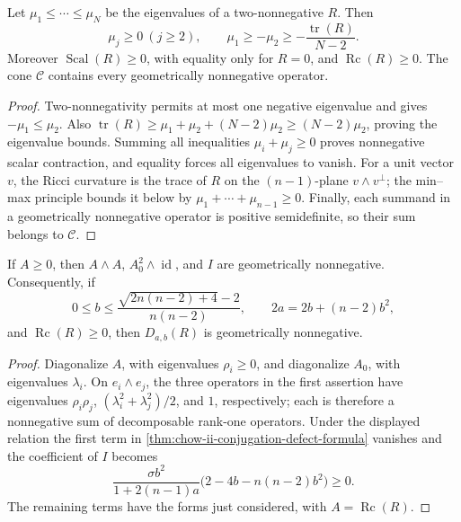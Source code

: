 \begin{lemma}
  \label{lem:chow-ii-two-nonnegative-consequences}
  Let \(\mu_1\le\cdots\le\mu_N\) be the eigenvalues of a two-nonnegative
  \(R\).  Then
  \[
    \mu_j\ge0\ (j\ge2),\qquad
    \mu_1\ge-\mu_2\ge-\frac{\operatorname{tr}(R)}{N-2}.
  \]
  Moreover \(\operatorname{Scal}(R)\ge0\), with equality only for \(R=0\),
  and \(\operatorname{Rc}(R)\ge0\).  The cone \(\mathcal C\) contains every
  geometrically nonnegative operator.
\end{lemma}
\begin{proof}
  Two-nonnegativity permits at most one negative eigenvalue and gives
  \(-\mu_1\le\mu_2\).  Also
  \(\operatorname{tr}(R)\ge\mu_1+\mu_2+(N-2)\mu_2\ge(N-2)\mu_2\), proving
  the eigenvalue bounds.  Summing all inequalities \(\mu_i+\mu_j\ge0\)
  proves nonnegative scalar contraction, and equality forces all eigenvalues
  to vanish.  For a unit vector \(v\), the Ricci curvature is the trace of
  \(R\) on the \((n-1)\)-plane \(v\wedge v^\perp\); the min--max principle
  bounds it below by \(\mu_1+\cdots+\mu_{n-1}\ge0\).  Finally, each summand in
  a geometrically nonnegative operator is positive semidefinite, so their sum
  belongs to \(\mathcal C\).
\end{proof}

\begin{lemma}
  \label{lem:chow-ii-geometric-nonnegativity-defect}
  If \(A\ge0\), then \(A\wedge A\), \(A_0^2\wedge\operatorname{id}\), and
  \(I\) are geometrically nonnegative.  Consequently, if
  \[
  0\le b\le\frac{\sqrt{2n(n-2)+4}-2}{n(n-2)},
  \qquad 2a=2b+(n-2)b^2,
  \]
  and \(\operatorname{Rc}(R)\ge0\), then \(D_{a,b}(R)\) is geometrically
  nonnegative.
\end{lemma}
\begin{proof}
  Diagonalize \(A\), with eigenvalues \(\rho_i\ge0\), and diagonalize
  \(A_0\), with eigenvalues \(\lambda_i\).  On \(e_i\wedge e_j\), the three
  operators in the first assertion have eigenvalues
  \(\rho_i\rho_j\), \((\lambda_i^2+\lambda_j^2)/2\), and \(1\), respectively;
  each is therefore a nonnegative sum of decomposable rank-one operators.
  Under the displayed relation the first term in
  \ref{thm:chow-ii-conjugation-defect-formula} vanishes and the coefficient
  of \(I\) becomes
  \[
  \frac{\sigma b^2}{1+2(n-1)a}\bigl(2-4b-n(n-2)b^2\bigr)\ge0.
  \]
  The remaining terms have the forms just considered, with
  \(A=\operatorname{Rc}(R)\).
\end{proof}

